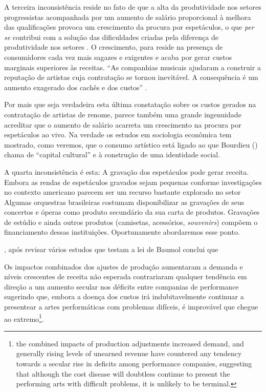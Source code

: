 \documentclass[a4paper, 12pt, openright, oneside, german, french, english, brazil]{abntex2}
\begin{document}
	A terceira inconsistência reside no fato de que a alta da produtividade nos setores progressistas acompanhada por um aumento de salário proporcional à melhora das qualificações provoca um crescimento da procura por espetáculos, o que \textit{per se} contribui com a solução das dificuldades criadas pela diferença de produtividade nos setores . O crescimento, para  reside na presença de consumidores cada vez mais sagazes e exigentes e acaba por gerar custos marginais superiores às receitas. ``As companhias musicais ajudaram a construir a reputação de artistas cuja contratação se tornou inevitável. A consequência é um aumento exagerado dos cachês e dos custos'' \cite[p. 61]{benhamou2007economia}.

	Por mais que seja verdadeira esta última constatação sobre os custos gerados na contratação de artistas de renome, parece também uma grande ingenuidade acreditar que o aumento de salário acarreta um crescimento na procura por espetáculos ao vivo. Na verdade os estudos em sociologia econômica tem mostrado, como veremos, que o consumo artístico está ligado ao que Bourdieu (\citeyear{bourdieu2011forms,bourdieu2003amor,bourdieu2007distincao}) chama de ``capital cultural'' e à construção de uma identidade social.

	A quarta inconsistência é esta: A gravação dos espetáculos pode gerar receita. Embora as rendas de espetáculos gravados sejam pequenas conforme investigações no contexto americano  parecem ser um recurso bastante explorado no setor Algumas orquestras brasileiras costumam disponibilizar as gravações de seus concertos e óperas como produto secundário da sua carta de produtos. Gravações de estúdio e ainda outros produtos (camisetas, acessórios, \textit{souvenirs}) compõem o financiamento dessas instituições. Oportunamente abordaremos esse ponto.

	, após revisar vários estudos que testam a lei de Baumol conclui que

	\begin{citacao}
		Os impactos combinados dos ajustes de produção aumentaram a demanda e níveis crescentes de receita não esperada contrariaram qualquer tendência em direção a um aumento secular nos déficits entre companias de performance sugerindo que, embora a doença dos custos irá indubitavelmente continuar a presentear a artes performáticas com problemas difíceis, é improvável que chegue ao extremo\footnote{the combined impacts of production adjustments increased demand, and generally rising levels of unearned revenue have countered any tendency towards a secular rise in deficits among performance companies, suggesting that although the cost disease will doubtless continue to present the performing arts with difficult problems, it is unlikely to be terminal.}. \cite[p. 16]{throsby1994production}
	\end{citacao}
\end{document}
